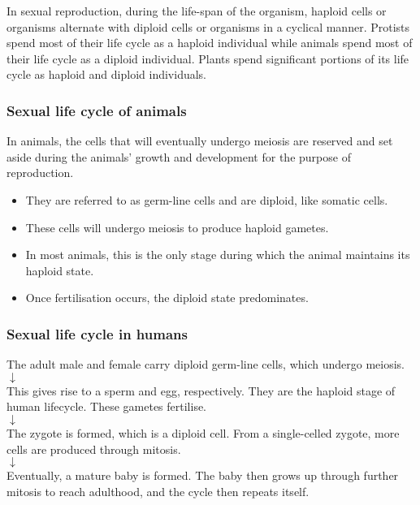 \documentclass[11pt]{article}
\begin{document}
In sexual reproduction, during the life-span of the organism, haploid cells or organisms alternate with diploid cells or organisms in a cyclical manner. Protists spend most of their life cycle as a haploid individual while animals spend most of their life cycle as a diploid individual. Plants spend significant portions of its life cycle as haploid and diploid individuals.

\subsubsection{Sexual life cycle of animals}
\label{sec:orgad42d87}
In animals, the cells that will eventually undergo meiosis are reserved and set aside during the animals' growth and development for the purpose of reproduction.
\begin{itemize}
\item They are referred to as germ-line cells and are diploid, like somatic cells.
\item These cells will undergo meiosis to produce haploid gametes.
\item In most animals, this is the only stage during which the animal maintains its haploid state.
\item Once fertilisation occurs, the diploid state predominates.
\end{itemize}

\subsubsection{Sexual life cycle in humans}
\label{sec:org537cf33}

\begin{center}
The adult male and female carry diploid germ-line cells, which undergo meiosis. \\
$\downarrow$ \\
This gives rise to a sperm and egg, respectively. They are the haploid stage of human lifecycle. These gametes fertilise. \\
$\downarrow$ \\
The zygote is formed, which is a diploid cell. From a single-celled zygote, more cells are produced through mitosis. \\
$\downarrow$ \\
Eventually, a mature baby is formed. The baby then grows up through further mitosis to reach adulthood, and the cycle then repeats itself.
\end{center}
\end{document}
